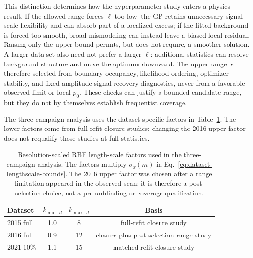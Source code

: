 This distinction determines how the hyperparameter study enters a physics result.
If the allowed range forces $\ell$ too low, the GP retains unnecessary
signal-scale flexibility and can absorb part of a localized excess; if the fitted
background is forced too smooth, broad mismodeling can instead leave a biased local
residual. Raising only the upper bound permits, but does not require, a smoother
solution. A larger data set also need not prefer a larger $\ell$: additional
statistics can resolve background structure and move the optimum downward. The
upper range is therefore selected from boundary occupancy, likelihood ordering,
optimizer stability, and fixed-amplitude signal-recovery diagnostics, never from a
favorable observed limit or local $p_0$. These checks can justify a bounded candidate
range, but they do not by themselves establish frequentist coverage.

The three-campaign analysis uses the dataset-specific factors in
Table~\ref{tab:production-lengthscale-bounds}. The lower factors come from full-refit
closure studies; changing the 2016 upper factor does not requalify those studies at
full statistics.

\begin{table}[H]
\centering
\begin{tabular}{lccc}
\toprule
Dataset & $k_{\min,d}$ & $k_{\max,d}$ & Basis \\
\midrule
2015 full & 1.0 & 8 & full-refit closure study \\
2016 full & 0.9 & 12 & closure plus post-selection range study \\
2021 10\% & 1.1 & 15 & matched-refit closure study \\
\bottomrule
\end{tabular}
\caption{Resolution-scaled RBF length-scale factors used in the three-campaign
analysis. The factors multiply $\sigma_x(m)$ in
Eq.~\eqref{eq:dataset-lengthscale-bounds}. The 2016 upper factor was chosen after a
range limitation appeared in the observed scan; it is therefore a post-selection
choice, not a pre-unblinding or coverage qualification.}
\label{tab:production-lengthscale-bounds}
\end{table}

